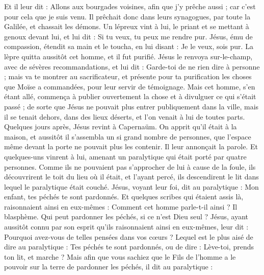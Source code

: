 \begin{multicols}{2}
Et il leur dit : Allons aux bourgades voisines, afin que j'y prêche aussi ; car c’est pour cela que je suis venu.
Il prêchait donc dans leurs synagogues, par toute la Galilée, et chassait les démons.
Un lépreux vint à lui, le priant et se mettant à genoux devant lui, et lui dit : Si tu veux, tu peux me rendre pur.
Jésus, ému de compassion, étendit sa main et le toucha, en lui disant : Je le veux, sois pur.
La lèpre quitta aussitôt cet homme, et il fut purifié.
Jésus le renvoya sur-le-champ, avec de sévères recommandations,
et lui dit : Garde-toi de ne rien dire à personne ; mais va te montrer au sacrificateur, et présente pour ta purification les choses que Moïse a commandées, pour leur servir de témoignage{}.
Mais cet homme, s’en étant allé, commença à publier ouvertement la chose et à divulguer ce qui s'était passé ; de sorte que Jésus ne pouvait plus entrer publiquement dans la ville, mais il se tenait dehors, dans des lieux déserts, et l’on venait à lui de toutes parts.
\VerseOne{}Quelques jours après, Jésus revint à Capernaüm. On apprit qu'il était à la maison,
et aussitôt il s’assembla un si grand nombre de personnes, que l'espace même devant la porte ne pouvait plus les contenir. Il leur annonçait la parole.
Et quelques-uns vinrent à lui, amenant un paralytique qui était porté par quatre personnes.
Comme ils ne pouvaient pas s’approcher de lui à cause de la foule, ils découvrirent le toit du lieu où il était, et l'ayant percé, ils descendirent le lit dans lequel le paralytique était couché.
Jésus, voyant leur foi, dit au paralytique : Mon enfant, tes péchés te sont pardonnés.
Et quelques scribes qui étaient assis là, raisonnaient ainsi en eux-mêmes :
Comment cet homme parle-t-il ainsi ? Il blasphème. Qui peut pardonner les péchés, si ce n’est Dieu seul ?
Jésus, ayant aussitôt connu par son esprit qu'ils raisonnaient ainsi en eux-mêmes, leur dit : Pourquoi avez-vous de telles pensées dans vos cœurs ?
Lequel est le plus aisé de dire au paralytique : Tes péchés te sont pardonnés, ou de dire : Lève-toi, prends ton lit, et marche ?
Mais afin que vous sachiez que le Fils de l'homme a le pouvoir sur la terre de pardonner les péchés, il dit au paralytique :

\end{multicols}
